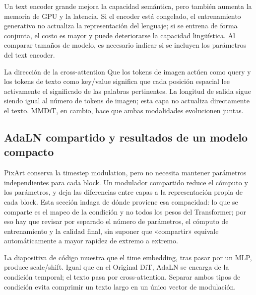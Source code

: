 
Un text encoder grande mejora la capacidad semántica, pero también aumenta la memoria de GPU y la latencia. Si el encoder está congelado, el entrenamiento generativo no actualiza la representación del lenguaje; si se entrena de forma conjunta, el costo es mayor y puede deteriorarse la capacidad lingüística. Al comparar tamaños de modelo, es necesario indicar si se incluyen los parámetros del text encoder.

\begin{knowledgebox}{La dirección de la cross-attention}
Que los tokens de imagen actúen como query y los tokens de texto como key/value significa que cada posición espacial lee activamente el significado de las palabras pertinentes. La longitud de salida sigue siendo igual al número de tokens de imagen; esta capa no actualiza directamente el texto. MMDiT, en cambio, hace que ambas modalidades evolucionen juntas.
\end{knowledgebox}

\subsection{AdaLN compartido y resultados de un modelo compacto}

PixArt conserva la timestep modulation, pero no necesita mantener parámetros independientes para cada block. Un modulador compartido reduce el cómputo y los parámetros, y deja las diferencias entre capas a la representación propia de cada block. Esta sección indaga de dónde proviene esa compacidad: lo que se comparte es el mapeo de la condición y no todos los pesos del Transformer; por eso hay que revisar por separado el número de parámetros, el cómputo de entrenamiento y la calidad final, sin suponer que «compartir» equivale automáticamente a mayor rapidez de extremo a extremo.


La diapositiva de código muestra que el time embedding, tras pasar por un MLP, produce scale/shift. Igual que en el Original DiT, AdaLN se encarga de la condición temporal; el texto pasa por cross-attention. Separar ambos tipos de condición evita comprimir un texto largo en un único vector de modulación.


